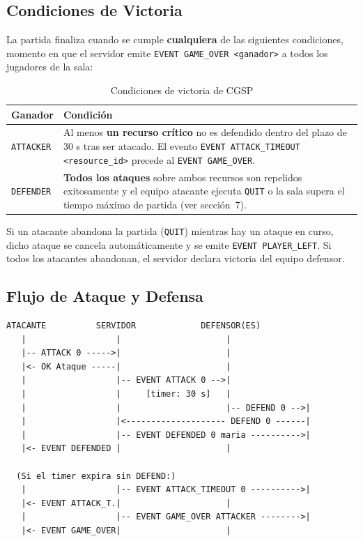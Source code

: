 \documentclass[12pt, letterpaper]{article}
\begin{document}
\subsection{Condiciones de Victoria}
\label{sec:victoria}

La partida finaliza cuando se cumple \textbf{cualquiera} de las siguientes condiciones,
momento en que el servidor emite \texttt{EVENT GAME\_OVER <ganador>} a todos los
jugadores de la sala:

\begin{table}[H]
\centering
\begin{tabularx}{\textwidth}{l X}
\toprule
\textbf{Ganador} & \textbf{Condición} \\
\midrule
\texttt{ATTACKER} & Al menos \textbf{un recurso crítico} no es defendido dentro del plazo de 30 s tras ser atacado. El evento \texttt{EVENT ATTACK\_TIMEOUT <resource\_id>} precede al \texttt{EVENT GAME\_OVER}. \\[6pt]
\texttt{DEFENDER} & \textbf{Todos los ataques} sobre ambos recursos son repelidos exitosamente y el equipo atacante ejecuta \texttt{QUIT} o la sala supera el tiempo máximo de partida (ver sección~7). \\
\bottomrule
\end{tabularx}
\caption{Condiciones de victoria de CGSP}
\end{table}

\begin{nota}
Si un atacante abandona la partida (\texttt{QUIT}) mientras hay un ataque en curso,
dicho ataque se cancela automáticamente y se emite \texttt{EVENT PLAYER\_LEFT}.
Si todos los atacantes abandonan, el servidor declara victoria del equipo defensor.
\end{nota}

\subsection{Flujo de Ataque y Defensa}

\begin{lstlisting}
ATACANTE          SERVIDOR             DEFENSOR(ES)
   |                  |                     |
   |-- ATTACK 0 ----->|                     |
   |<- OK Ataque -----|                     |
   |                  |-- EVENT ATTACK 0 -->|
   |                  |     [timer: 30 s]   |
   |                  |                     |-- DEFEND 0 -->|
   |                  |<-------------------- DEFEND 0 ------|
   |                  |-- EVENT DEFENDED 0 maria ---------->|
   |<- EVENT DEFENDED |                     |

  (Si el timer expira sin DEFEND:)
   |                  |-- EVENT ATTACK_TIMEOUT 0 ---------->|
   |<- EVENT ATTACK_T.|                     |
   |                  |-- EVENT GAME_OVER ATTACKER -------->|
   |<- EVENT GAME_OVER|                     |
\end{lstlisting}
\end{document}
